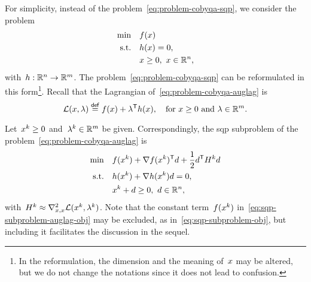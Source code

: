 For simplicity, instead of the problem~\cref{eq:problem-cobyqa-sqp}, we consider the problem
\begin{subequations}
    \label{eq:problem-cobyqa-auglag}
    \begin{align}
        \min        & \quad \obj(\iter)\\
        \text{s.t.} & \quad h(\iter) = 0,\\
                    & \quad \iter \ge 0, ~ \iter \in \R^n, \nonumber
    \end{align}
\end{subequations}
with~$h : \mathbb{R}^n \to \mathbb{R}^m$.
The problem~\cref{eq:problem-cobyqa-sqp} can be reformulated in this form\footnote{In the reformulation, the dimension and the meaning of~$\iter$ may be altered, but we do not change the notations since it does not lead to confusion.}.
Recall that the Lagrangian of~\cref{eq:problem-cobyqa-auglag} is
\begin{equation*}
    \lag(\iter, \lm) \eqdef \obj(\iter) + \lm^{\T} h(\iter), \quad \text{for~$\iter \ge 0$ and~$\lm \in \R^m$.}
\end{equation*}

Let~$\iter[k] \ge 0$ and~$\lm[k] \in \R^m$ be given.
Correspondingly, the \gls{sqp} subproblem of the problem~\cref{eq:problem-cobyqa-auglag} is
\begin{subequations}
    \label{eq:sqp-subproblem-auglag}
    \begin{align}
        \min        & \quad \obj(\iter[k]) + \nabla \obj(\iter[k])^{\T} \step + \frac{1}{2} \step^{\T} H^k \step \label{eq:sqp-subproblem-auglag-obj}\\
        \text{s.t.} & \quad h(\iter[k]) + \nabla h(\iter[k]) \step = 0,\\
                    & \quad \iter[k] + \step \ge 0, ~ \step \in \R^n,
    \end{align}
\end{subequations}
with~$H^k \approx \nabla_{x, x}^2 \lag(\iter[k], \lm[k])$.
Note that the constant term~$\obj(\iter[k])$ in~\cref{eq:sqp-subproblem-auglag-obj} may be excluded, as in~\cref{eq:sqp-subproblem-obj}, but including it facilitates the discussion in the sequel.

